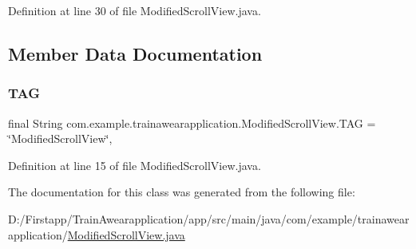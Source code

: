 Definition at line 30 of file Modified\+Scroll\+View.\+java.


\begin{DoxyCode}{0}

\end{DoxyCode}


\subsection{Member Data Documentation}
\mbox{\label{classcom_1_1example_1_1trainawearapplication_1_1_modified_scroll_view_aa8c3ba8f3bb238ac0f2d56e82757814a}} 
\subsubsection{\texorpdfstring{TAG}{TAG}}
{\footnotesize\ttfamily final String com.\+example.\+trainawearapplication.\+Modified\+Scroll\+View.\+T\+AG = \char`\"{}Modified\+Scroll\+View\char`\"{}\hspace{0.3cm}{\ttfamily [static]}, {\ttfamily [private]}}



Definition at line 15 of file Modified\+Scroll\+View.\+java.



The documentation for this class was generated from the following file\+:\begin{DoxyCompactItemize}
\item 
D\+:/\+Firstapp/\+Train\+Awearapplication/app/src/main/java/com/example/trainawearapplication/\mbox{\hyperlink{_modified_scroll_view_8java}{Modified\+Scroll\+View.\+java}}\end{DoxyCompactItemize}
